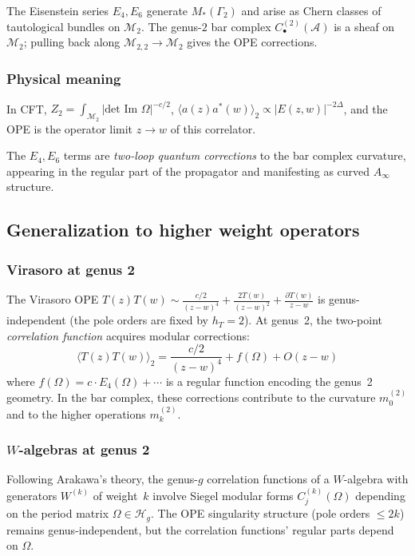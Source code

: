 The Eisenstein series $E_4, E_6$ generate $M_*(\Gamma_2)$ and arise as Chern classes of tautological bundles on $\mathcal{M}_2$.  The genus-$2$ bar complex $C_{\bullet}^{(2)}(\mathcal{A})$ is a sheaf on $\mathcal{M}_2$; pulling back along $\mathcal{M}_{2,2} \to \mathcal{M}_2$ gives the OPE corrections.

\subsubsection{Physical meaning}

In CFT, $Z_2 = \int_{\mathcal{M}_2} |\text{det Im } \Omega|^{-c/2}$,
$\langle a(z) a^*(w) \rangle_2 \propto |E(z,w)|^{-2\Delta}$,
and the OPE is the operator limit $z \to w$ of this correlator.

The $E_4, E_6$ terms are \emph{two-loop quantum corrections} to the bar complex curvature,
appearing in the regular part of the propagator and manifesting as curved $A_\infty$ structure.

\subsection{Generalization to higher weight operators}

\subsubsection{Virasoro at genus 2}

The Virasoro OPE $T(z) T(w) \sim \frac{c/2}{(z-w)^4} + \frac{2T(w)}{(z-w)^2} + \frac{\partial T(w)}{z-w}$
is genus-independent (the pole orders are fixed by $h_T = 2$). At genus~2, the
two-point \emph{correlation function} acquires modular corrections:
\[\langle T(z) T(w) \rangle_2 = \frac{c/2}{(z-w)^4} + f(\Omega) + O(z-w)\]
where $f(\Omega) = c \cdot E_4(\Omega) + \cdots$ is a regular function encoding the
genus~2 geometry. In the bar complex, these corrections contribute to the
curvature $m_0^{(2)}$ and to the higher operations $m_k^{(2)}$.

\subsubsection{\texorpdfstring{$W$-algebras at genus 2}{$\mathcal{W}$-algebras at genus 2}}

Following Arakawa's theory, the genus-$g$ correlation functions of a
$W$-algebra with generators $W^{(k)}$ of weight~$k$ involve Siegel modular
forms $C_j^{(k)}(\Omega)$ depending on the period matrix $\Omega \in \mathcal{H}_g$.
The OPE singularity structure (pole orders $\leq 2k$) remains genus-independent,
but the correlation functions' regular parts depend on $\Omega$.

